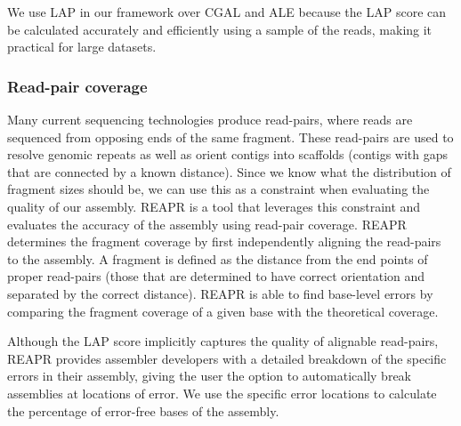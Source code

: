 We use LAP in our framework over CGAL and ALE because the LAP score can be calculated accurately and efficiently using a sample of the reads, making it practical for large datasets.


\subsubsection{Read-pair coverage}


Many current sequencing technologies produce read-pairs, where reads are sequenced from opposing ends of the same fragment.
These read-pairs are used to resolve genomic repeats as well as orient contigs into scaffolds (contigs with gaps that are connected by a known distance).
Since we know what the distribution of fragment sizes should be, we can use this as a constraint when evaluating the quality of our assembly.
REAPR\cite{hunt2013reapr} is a tool that leverages this constraint and evaluates the accuracy of the assembly using read-pair coverage.
REAPR determines the fragment coverage by first independently aligning the read-pairs to the assembly.
A fragment is defined as the distance from the end points of proper read-pairs (those that are determined to have correct orientation and separated by the correct distance).
REAPR is able to find base-level errors by comparing the fragment coverage of a given base with the theoretical coverage.

Although the LAP score implicitly captures the quality of alignable read-pairs, REAPR provides assembler developers with a detailed breakdown of the specific errors in their assembly, giving the user the option to automatically break assemblies at locations of error.
We use the specific error locations to calculate the percentage of error-free bases of the assembly.




